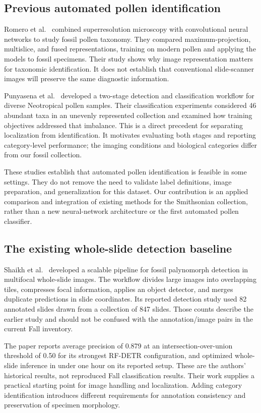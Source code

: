 \documentclass[conference,letterpaper]{IEEEtran}
\begin{document}
\subsection{Previous automated pollen identification}
Romero et al.\ \cite{romero2020} combined superresolution microscopy with convolutional neural networks to study fossil pollen taxonomy. They compared maximum-projection, multislice, and fused representations, training on modern pollen and applying the models to fossil specimens. Their study shows why image representation matters for taxonomic identification. It does not establish that conventional slide-scanner images will preserve the same diagnostic information.

Punyasena et al.\ \cite{punyasena2022} developed a two-stage detection and classification workflow for diverse Neotropical pollen samples. Their classification experiments considered 46 abundant taxa in an unevenly represented collection and examined how training objectives addressed that imbalance. This is a direct precedent for separating localization from identification. It motivates evaluating both stages and reporting category-level performance; the imaging conditions and biological categories differ from our fossil collection.

These studies establish that automated pollen identification is feasible in some settings. They do not remove the need to validate label definitions, image preparation, and generalization for this dataset. Our contribution is an applied comparison and integration of existing methods for the Smithsonian collection, rather than a new neural-network architecture or the first automated pollen classifier.

\subsection{The existing whole-slide detection baseline}
Shaikh et al.\ \cite{shaikh2026} developed a scalable pipeline for fossil palynomorph detection in multifocal whole-slide images. The workflow divides large images into overlapping tiles, compresses focal information, applies an object detector, and merges duplicate predictions in slide coordinates. Its reported detection study used 82 annotated slides drawn from a collection of 847 slides. Those counts describe the earlier study and should not be confused with the \SlideCount{} annotation/image pairs in the current Fall inventory.

The paper reports average precision of 0.879 at an intersection-over-union threshold of 0.50 for its strongest RF-DETR configuration, and optimized whole-slide inference in under one hour on its reported setup. These are the authors' historical results, not reproduced Fall classification results. Their work supplies a practical starting point for image handling and localization. Adding category identification introduces different requirements for annotation consistency and preservation of specimen morphology.
\end{document}
